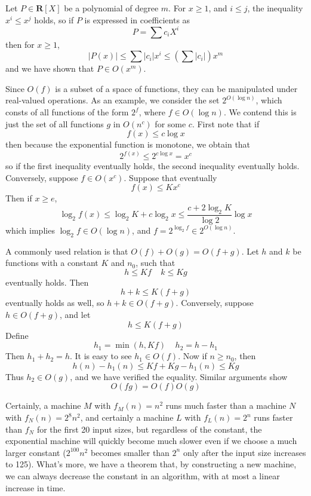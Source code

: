 \begin{example}
    Let $P \in \mathbf{R}[X]$ be a polynomial of degree $m$. For $x \geq 1$, and $i \leq j$, the inequality $x^i \leq x^j$ holds, so if $P$ is expressed in coefficients as
    \[ P = \sum c_i X^i \]
    then for $x \geq 1$,
    \[ |P(x)| \leq \sum |c_i| x^i \leq \left( \sum |c_i| \right) x^m \]
    and we have shown that $P \in O(x^m)$.
\end{example}

\begin{example}
    Since $O(f)$ is a subset of a space of functions, they can be manipulated under real-valued operations. As an example, we consider the set $2^{O(\log n)}$, which consts of all functions of the form $2^f$, where $f \in O(\log n)$. We contend this is just the set of all functions $g$ in $O(n^c)$ for some $c$. First note that if
    \[ f(x) \leq c \log x \]
    then because the exponential function is monotone, we obtain that
    \[ 2^{f(x)} \leq 2^{c \log x} = x^c \]
    so if the first inequality eventually holds, the second inequality eventually holds. Conversely, suppose $f \in O(x^c)$. Suppose that eventually
    \[ f(x) \leq K x^c \]
    Then if $x \geq e$,
    \[ \log_2 f(x) \leq \log_2 K + c \log_2 x \leq \frac{c + 2 \log_2 K}{\log 2} \log x \]
    which implies $\log_2 f \in O(\log n)$, and $f = 2^{\log_2 f} \in 2^{O(\log n)}$.
\end{example}

\begin{example}
    A commonly used relation is that $O(f) + O(g) = O(f + g)$. Let $h$ and $k$ be functions with a constant $K$ and $n_0$, such that
    \[ h \leq Kf\ \ \ \ \ k \leq Kg \]
    eventually holds. Then
    \[ h + k \leq K(f + g)\]
    eventually holds as well, so $h + k \in O(f + g)$. Conversely, suppose $h \in O(f + g)$, and let
    \[ h \leq K(f + g) \]
    Define
    \[ h_1 = \min(h,Kf)\ \ \ \ \ h_2 = h - h_1 \]
    Then $h_1 + h_2 = h$. It is easy to see $h_1 \in O(f)$. Now if $n \geq n_0$, then
    \[ h(n) - h_1(n) \leq Kf + Kg - h_1(n) \leq Kg \]
    Thus $h_2 \in O(g)$, and we have verified the equality. Similar arguments show
    \[ O(fg) = O(f)O(g) \]
\end{example}

Certainly, a machine $M$ with $f_M(n) = n^2$ runs much faster than a machine $N$ with $f_N(n) = 2^8 n^2$, and certainly a machine $L$ with $f_L(n) = 2^n$ runs faster than $f_N$ for the first 20 input sizes, but regardless of the constant, the exponential machine will quickly become much slower even if we choose a much larger constant ($2^{100} n^2$ becomes smaller than $2^n$ only after the input size increases to 125). What's more, we have a theorem that, by constructing a new machine, we can always decrease the constant in an algorithm, with at most a linear increase in time.

